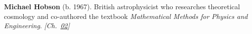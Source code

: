 \textbf{Michael Hobson} (b. 1967). British astrophysicist who researches theoretical cosmology and co-authored the textbook \emph{Mathematical Methods for Physics and Engineering}. \emph{[Ch.~\hyperref[ch:acceleratinguniverse]{02}]}

